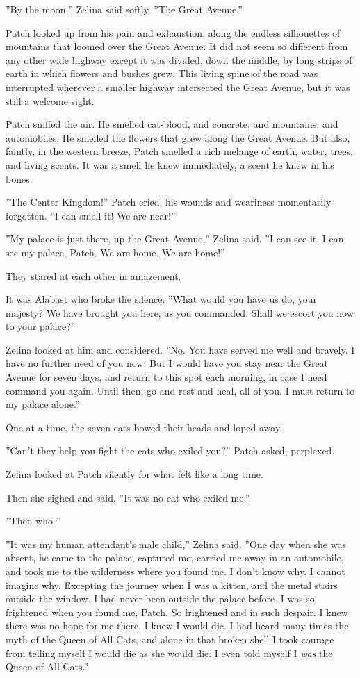 \documentclass[12pt]{book}
\begin{document}
''By the moon,'' Zelina said softly. ''The Great Avenue.''

Patch looked up from his pain and exhaustion, along the endless silhouettes of mountains that loomed over the Great Avenue. It did not seem so different from any other wide highway %
except it was divided, down the middle, by long strips of earth in which flowers and bushes grew. This living spine of the road was interrupted wherever a smaller highway intersected the Great Avenue, but it was still a welcome sight.

Patch sniffed the air. He smelled cat-blood, and concrete, and mountains, and automobiles. He smelled the flowers that grew along the Great Avenue. But also, faintly, in the western breeze, Patch smelled a rich melange of earth, water, trees, and living scents. It was a smell he knew immediately, a scent he knew in his bones.

''The Center Kingdom!'' Patch cried, his wounds and weariness momentarily forgotten. ''I can smell it! We are near!''

''My palace is just there, up the Great Avenue,'' Zelina said. ''I can see it. I can see my palace, Patch. We are home. We are home!''

They stared at each other in amazement.

It was Alabast who broke the silence. ''What would you have us do, your majesty? We have brought you here, as you commanded. Shall we escort you now to your palace?''

Zelina looked at him and considered. ''No. You have served me well and bravely. I have no further need of you now. But I would have you stay near the Great Avenue for seven days, and return to this spot each morning, in case I need command you again. Until then, go and rest and heal, all of you. I must return to my palace alone.''

One at a time, the seven cats bowed their heads and loped away.

''Can't they help you fight the cats who exiled you?'' Patch asked, perplexed.

Zelina looked at Patch silently for what felt like a long time.

Then she sighed and said, ''It was no cat who exiled me.''

''Then who %
''

''It was my human attendant's male child,'' Zelina said. ''One day when she was absent, he came to the palace, captured me, carried me away in an automobile, and took me to the wilderness where you found me. I don't know why. I cannot imagine why. Excepting the journey when I was a kitten, and the metal stairs outside the window, I had never been outside the palace before. I was so frightened when you found me, Patch. So frightened and in such despair. I knew there was no hope for me there. I knew I would die. I had heard many times the myth of the Queen of All Cats, and alone in that broken shell I took courage from telling myself I would die as she would die. I even told myself I {\it was} the Queen of All Cats.''
\end{document}
